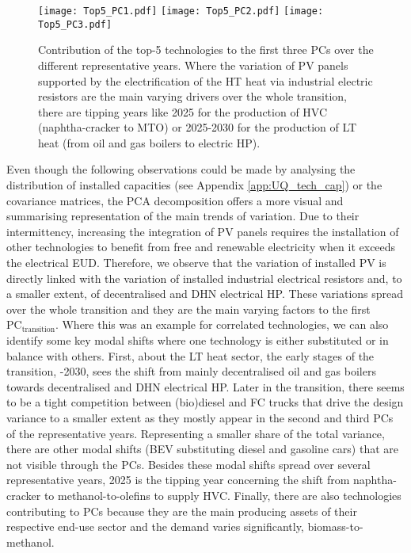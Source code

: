 \begin{figure}[!htbp]
\centering
\texttt{[image: Top5\_PC1.pdf]}
\texttt{[image: Top5\_PC2.pdf]}
\texttt{[image: Top5\_PC3.pdf]}
\caption{Contribution of the top-5 technologies to the first three \gls{PCs} over the different representative years. Where the variation of \gls{PV} panels supported by the electrification of the \gls{HT} heat via industrial electric resistors are the main varying drivers over the whole transition, there are tipping years like 2025 for the production of \gls{HVC} (\ie naphtha-cracker to \gls{MTO}) or 2025-2030 for the production of \gls{LT} heat (\ie from oil and gas boilers to electric \gls{HP}).}
\label{fig:Top5_PC_year}
\end{figure}

Even though the following observations could be made by analysing the distribution of installed capacities (see Appendix \ref{app:UQ_tech_cap}) or the covariance matrices, the \gls{PCA} decomposition offers a more visual and summarising representation of the main trends of variation. Due to their intermittency, increasing the integration of \gls{PV} panels requires the installation of other technologies to benefit from free and renewable electricity when it exceeds the electrical \gls{EUD}. Therefore, we observe that the variation of installed \gls{PV} is directly linked with the variation of installed industrial electrical resistors and, to a smaller extent, of decentralised and \gls{DHN} electrical \gls{HP}. These variations spread over the whole transition and they are the main varying factors to the first $\text{PC}_{\text{transition}}$. Where this was an example for correlated technologies, we can also identify some key modal shifts where one technology is either substituted or in balance with others. First, about the \gls{LT} heat sector, the early stages of the transition, -2030, sees the shift from mainly decentralised oil and gas boilers towards decentralised and \gls{DHN} electrical \gls{HP}. Later in the transition, there seems to be a tight competition between (bio)diesel and \gls{FC} trucks that drive the design variance to a smaller extent as they mostly appear in the second and third \gls{PCs} of the representative years. Representing a smaller share of the total variance, there are other modal shifts (\eg \gls{BEV} substituting diesel and gasoline cars) that are not visible through the \gls{PCs}. Besides these modal shifts spread over several representative years, 2025 is the tipping year concerning the shift from naphtha-cracker to methanol-to-olefins to supply \gls{HVC}. Finally, there are also technologies contributing to \gls{PCs} because they are the main producing assets of their respective end-use sector and the demand varies significantly, \eg biomass-to-methanol.

